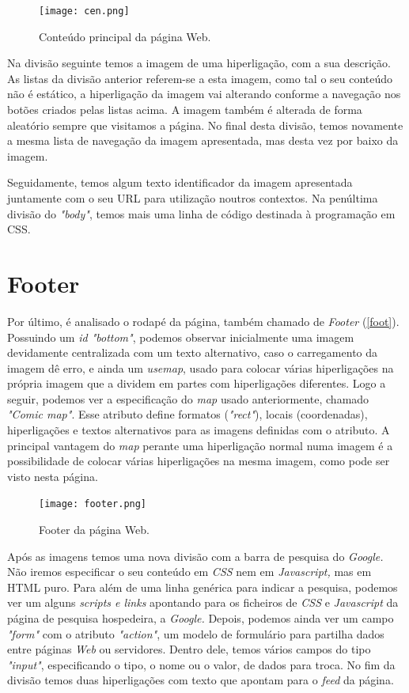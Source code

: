 \documentclass[11pt,openright,twoside]{report}
\begin{document}
\begin{figure}
 \center
 \texttt{[image: cen.png]}
 \caption{Conteúdo principal da página Web.}
 \label{cen}
\end{figure}


Na divisão seguinte temos a imagem de uma hiperligação, com a sua descrição. As listas da divisão anterior referem-se a esta imagem, como tal o seu conteúdo não é estático, a hiperligação da imagem vai alterando conforme a navegação nos botões criados pelas listas acima. A imagem também é alterada de forma aleatório sempre que visitamos a página. No final desta divisão, temos novamente a mesma lista de navegação da imagem apresentada, mas desta vez por baixo da imagem.
\smallskip

Seguidamente, temos algum texto identificador da imagem apresentada juntamente com o seu URL para utilização noutros contextos. Na penúltima divisão do \textit{"body"}, temos mais uma linha de código destinada à programação em CSS.
\smallskip


\section{Footer}
Por último, é analisado o rodapé da página, também chamado de \textit{Footer} (\autoref{foot}). Possuindo um \textit{id "bottom"}, podemos observar inicialmente uma imagem devidamente centralizada com um texto alternativo, caso o carregamento da imagem dê erro, e ainda um \textit{usemap}, usado para colocar várias hiperligações na própria imagem que a dividem em partes com hiperligações diferentes. Logo a seguir, podemos ver a especificação do \textit{map} usado anteriormente, chamado \textit{"Comic map"}. Esse atributo define formatos (\textit{"rect"}), locais (coordenadas), hiperligações e textos alternativos para as imagens definidas com o atributo. A principal vantagem do \textit{map} perante uma hiperligação normal numa imagem é a possibilidade de colocar várias hiperligações na mesma imagem, como pode ser visto nesta página.
\smallskip 

\begin{figure}
 \center
 \texttt{[image: footer.png]}
 \caption{Footer da página Web.}
 \label{foot}
\end{figure}


Após as imagens temos uma nova divisão com a barra de pesquisa do \textit{Google.} Não iremos especificar o seu conteúdo em \textit{CSS} nem em \textit{Javascript,} mas em HTML puro. Para além de uma linha genérica para indicar a pesquisa, podemos ver um alguns \textit{scripts e links} apontando para os ficheiros de\textit{ CSS} e \textit{Javascript} da página de pesquisa hospedeira, a \textit{Google.} Depois, podemos ainda ver um campo\textit{ "form"} com o atributo \textit{"action"}, um modelo de formulário para partilha dados entre páginas \textit{Web} ou servidores. Dentro dele, temos vários campos do tipo \textit{"input"}, especificando o tipo, o nome ou o valor, de dados para troca. No fim da divisão temos duas hiperligações com texto que apontam para o \textit{feed} da página.
\smallskip 
\end{document}
